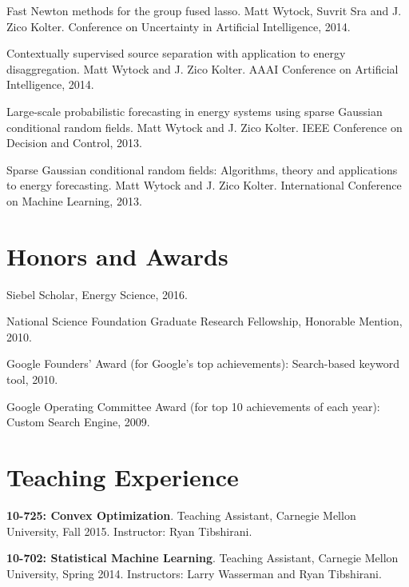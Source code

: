 \documentclass[margin, line]{res}
\begin{document}
\begin{resume}
Fast Newton methods for the group fused lasso. Matt Wytock, Suvrit Sra and
J. Zico Kolter. Conference on Uncertainty in Artificial Intelligence, 2014.

Contextually supervised source separation with application to energy
disaggregation. Matt Wytock and J. Zico Kolter. AAAI Conference on Artificial
Intelligence, 2014.

Large-scale probabilistic forecasting in energy systems using sparse Gaussian
conditional random fields. Matt Wytock and J. Zico Kolter. IEEE Conference
on Decision and Control, 2013.

Sparse Gaussian conditional random fields: Algorithms, theory and applications
to energy forecasting. Matt Wytock and J. Zico Kolter. International Conference
on Machine Learning, 2013.

\section{Honors and Awards}

Siebel Scholar, Energy Science, 2016.

National Science Foundation Graduate Research Fellowship, Honorable Mention,
2010.

Google Founders' Award (for Google's top achievements): Search-based keyword
tool, 2010.

Google Operating Committee Award (for top 10 achievements of each year): Custom Search Engine, 2009.






\section{Teaching Experience}

{\bf 10-725: Convex Optimization}. Teaching Assistant, Carnegie Mellon University, Fall
2015. Instructor: Ryan Tibshirani.

{\bf 10-702: Statistical Machine Learning}. Teaching Assistant, Carnegie
Mellon University, Spring 2014. Instructors: Larry Wasserman and Ryan Tibshirani.


\end{resume}
\end{document}
